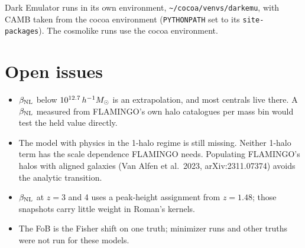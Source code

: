 \documentclass[11pt]{article}
\newcommand{\Msun}{\,h^{-1}M_\odot}
\newcommand{\bNL}{\beta_{\rm NL}}
\newcommand{\ZEmu}{1.48}           %
\begin{document}
Dark Emulator runs in its own environment, \texttt{\~{}/cocoa/venvs/darkemu},
with CAMB taken from the cocoa environment (\texttt{PYTHONPATH} set to its
\texttt{site-packages}). The cosmolike runs use the cocoa environment.

\section{Open issues}
\label{app:open}

\begin{itemize}
\item $\bNL$ below $10^{\lgMEhi}\Msun$ is an extrapolation, and most centrals
  live there. A $\bNL$ measured from FLAMINGO's own halo catalogues per mass
  bin would test the held value directly.
\item The model with physics in the 1-halo regime is still missing. Neither
  1-halo term has the scale dependence FLAMINGO needs. Populating FLAMINGO's
  halos with aligned galaxies (Van Alfen et al.\ 2023, arXiv:2311.07374)
  avoids the analytic transition.
\item $\bNL$ at $z = 3$ and 4 uses a peak-height assignment from
  $z = \ZEmu$; those snapshots carry little weight in Roman's kernels.
\item The FoB is the Fisher shift on one truth; minimizer runs and other
  truths were not run for these models.
\end{itemize}
\end{document}
